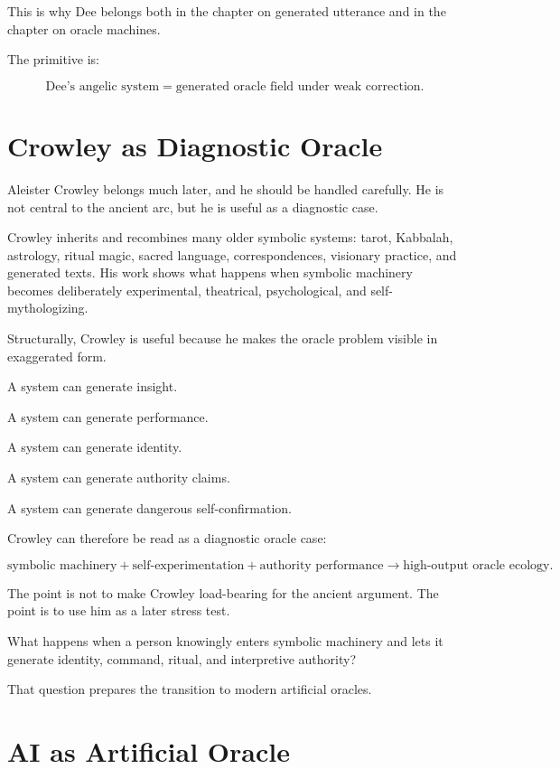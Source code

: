 \documentclass[11pt]{book}
\begin{document}
This is why Dee belongs both in the chapter on generated utterance and in the chapter on oracle machines.

The primitive is:

\[
\text{Dee's angelic system} = \text{generated oracle field under weak correction}.
\]

\section{Crowley as Diagnostic Oracle}

Aleister Crowley belongs much later, and he should be handled carefully. He is not central to the ancient arc, but he is useful as a diagnostic case.

Crowley inherits and recombines many older symbolic systems: tarot, Kabbalah, astrology, ritual magic, sacred language, correspondences, visionary practice, and generated texts. His work shows what happens when symbolic machinery becomes deliberately experimental, theatrical, psychological, and self-mythologizing.

Structurally, Crowley is useful because he makes the oracle problem visible in exaggerated form.

A system can generate insight.

A system can generate performance.

A system can generate identity.

A system can generate authority claims.

A system can generate dangerous self-confirmation.

Crowley can therefore be read as a diagnostic oracle case:

\[
\text{symbolic machinery}
+
\text{self-experimentation}
+
\text{authority performance}
\rightarrow
\text{high-output oracle ecology}.
\]

The point is not to make Crowley load-bearing for the ancient argument. The point is to use him as a later stress test.

What happens when a person knowingly enters symbolic machinery and lets it generate identity, command, ritual, and interpretive authority?

That question prepares the transition to modern artificial oracles.

\section{AI as Artificial Oracle}
\end{document}
